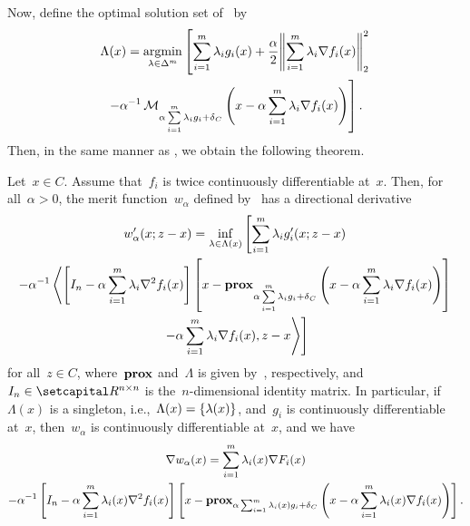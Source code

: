 \documentclass[../../main]{subfiles}
\begin{document}
                           Now, define the optimal solution set of~ by
                           \begin{multline} \label{eq:Pi}
                               \Lambda(x) = \argmin_{\lambda \in \Delta^m} \left[ \sum_{i = 1}^{m} \lambda_i g_i(x) + \frac{\alpha}{2} \norm*{\sum_{i = 1}^{m} \lambda_i \nabla f_i(x)}_2^2 \right. \\
                               \left. - \alpha^{-1} \envelope_{\alpha \sum\limits_{i = 1}^{m} \lambda_i g_i + \indicator_C}\left( x - \alpha \sum_{i = 1}^{m} \lambda_i \nabla f_i(x) \right) \right] 
                           .\end{multline} 
                           Then, in the same manner as , we obtain the following theorem.
                           \begin{theorem} 
                               Let~$x \in C$.
                               Assume that~$f_i$ is twice continuously differentiable at~$x$.
                               Then, for all~$\alpha > 0$, the merit function~$w_\alpha$ defined by~ has a directional derivative
                               \begin{multline}
                                   w_\alpha'(x; z - x) = \inf_{\lambda \in \Lambda(x)} \left[ \sum_{i = 1}^{m} \lambda_i g_i'(x; z - x) \right. \\
                                   - \alpha^{-1} \left\langle \left[ I_n - \alpha \sum_{i = 1}^{m} \lambda_i \nabla^2 f_i(x) \right] \left[x - \prox_{\alpha \sum\limits_{i = 1}^{m} \lambda_i g_i + \indicator_C} \left( x - \alpha \sum_{i = 1}^{m} \lambda_i \nabla f_i(x) \right) \right] \right.\\
                                   \left. \left.- \alpha \sum_{i = 1}^{m} \lambda_i \nabla f_i(x) , z - x \right\rangle \right] 
                               \end{multline}
                               for all~$z \in C$, where~$\prox$ and~$\Lambda$ is given by~, respectively, and~$I_n \in \setR^{n \times n}$ is the~$n$-dimensional identity matrix.
                               In particular, if~$\Lambda(x)$ is a singleton, i.e.,~$\Lambda(x) = \set*{\lambda(x)}$, and~$g_i$ is continuously differentiable at~$x$, then~$w_\alpha$ is continuously differentiable at~$x$, and we have
                               \begin{multline}
                                   \nabla w_\alpha(x) = \sum_{i = 1}^{m} \lambda_i(x) \nabla F_i(x) \\
                                   - \alpha^{-1} \left[ I_n - \alpha \sum_{i = 1}^{m} \lambda_i(x) \nabla^2 f_i(x) \right] \left[x - \prox_{\alpha \sum_{i = 1}^{m} \lambda_i(x) g_i + \indicator_C} \left( x - \alpha \sum_{i = 1}^{m} \lambda_i(x) \nabla f_i(x) \right) \right]
                               .\end{multline}
                           \end{theorem}
\end{document}

